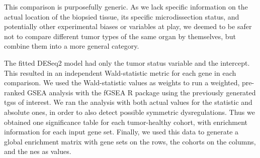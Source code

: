 This comparison is purposefully generic.
As we lack specific information on the actual location of the biopsied tissue, its specific microdissection status, and potentially other experimental biases or variables at play, we deemed to be safer not to compare different tumor types of the same organ by themselves, but combine them into a more general category.


The fitted DESeq2 model had only the tumor status variable and the intercept.
This resulted in an independent Wald-statistic metric for each gene in each comparison.
We used the Wald-statistic values as weights to run a weighted, pre-ranked GSEA analysis with the fGSEA R package \cite{korotkevichFastGeneSet2021} using the previously generated \glspl{tgs} of interest.
We ran the analysis with both actual values for the statistic and absolute ones, in order to also detect possible symmetric dysregulations.
Thus we obtained one significance table for each tumor-healthy cohort, with enrichment information for each input gene set.
Finally, we used this data to generate a global enrichment matrix with gene sets on the rows, the cohorts on the columns, and the \gls{nes} as values.

